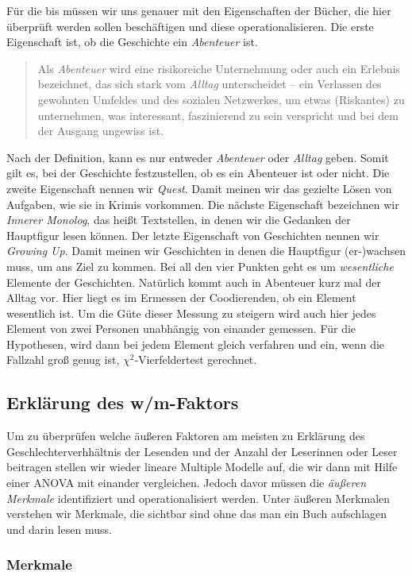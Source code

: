 Für die  bis  müssen wir uns genauer mit den
Eigenschaften der Bücher, die hier überprüft werden sollen beschäftigen
und diese operationalisieren. Die erste Eigenschaft ist, ob die
Geschichte ein \emph{Abenteuer} ist.
\blockcquote[Hervorhebung P.\,F.][\texttt{\href{http://de.wikipedia.org/wiki/abenteuer}{/wiki/abenteuer}}]{de.wiki}{Als \emph{Abenteuer} \textelp{} wird eine risikoreiche Unternehmung oder auch ein Erlebnis bezeichnet, das sich stark vom \emph{Alltag} unterscheidet -- ein Verlassen des gewohnten Umfeldes und des sozialen Netzwerkes, um etwas (Riskantes) zu unternehmen, was interessant, faszinierend zu sein verspricht und bei dem der Ausgang ungewiss ist.}
Nach der Definition, kann es nur entweder \emph{Abenteuer} oder
\emph{Alltag} geben. Somit gilt es, bei der Geschichte festzustellen, ob
es ein Abenteuer ist oder nicht. Die zweite Eigenschaft nennen wir
\emph{Quest}. Damit meinen wir das gezielte Lösen von Aufgaben, wie sie
\zB in Krimis vorkommen. Die nächste Eigenschaft bezeichnen wir
\emph{Innerer Monolog}, das heißt Textstellen, in denen wir die Gedanken
der Hauptfigur lesen können. Der letzte Eigenschaft von Geschichten
nennen wir \emph{Growing Up}. Damit meinen wir Geschichten in denen die
Hauptfigur (er-)wachsen muss, um ans Ziel zu kommen. Bei all den vier
Punkten geht es um \emph{wesentliche} Elemente der Geschichten.
Natürlich kommt auch in Abenteuer kurz mal der Alltag vor. Hier liegt es
im Ermessen der Coodierenden, ob ein Element wesentlich ist. Um die Güte
dieser Messung zu steigern wird auch hier jedes Element von zwei
Personen unabhängig von einander gemessen. Für die Hypothesen, wird dann
bei jedem Element gleich verfahren und ein, wenn die Fallzahl groß genug
ist, $\chi^2$-Vierfeldertest gerechnet.

\subsection{Erklärung des w/m-Faktors}

Um zu überprüfen welche äußeren Faktoren am meisten zu Erklärung des
Geschlechterverhhältnis der Lesenden und der Anzahl der Leserinnen oder
Leser beitragen stellen wir wieder lineare Multiple Modelle auf, die wir
dann mit Hilfe einer ANOVA mit einander vergleichen. Jedoch davor müssen
die \emph{äußeren Merkmale} identifiziert und operationalisiert werden.
Unter äußeren Merkmalen verstehen wir Merkmale, die sichtbar sind ohne
das man ein Buch aufschlagen und darin lesen muss.

\subsubsection{Merkmale}

